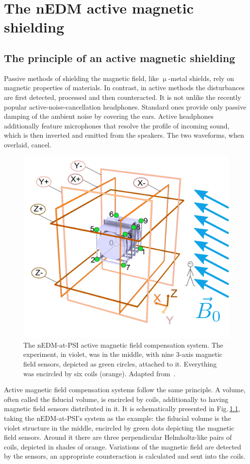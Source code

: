 \chapter{The nEDM active magnetic shielding}

\label{ch:nedm_sfc}


\section{The principle of an active magnetic shielding}
Passive methods of shielding the magnetic field, like $\upmu$-metal shields, rely on magnetic properties of materials. In contrast, in active methods the disturbances are first detected, processed and then counteracted. It is not unlike the recently popular active-noise-cancellation headphones. Standard ones provide only passive damping of the ambient noise by covering the ears. Active headphones additionally feature microphones that resolve the profile of incoming sound, which is then inverted and emitted from the speakers. The two waveforms, when overlaid, cancel.

\begin{figure}
  \centering
  \includegraphics[width=0.7\linewidth]{gfx/nEDM_SFC/SFCplain.pdf}
  \caption{The nEDM-at-PSI active magnetic field compensation system. The experiment, in violet, was in the middle, with nine 3-axis magnetic field sensors, depicted as green circles, attached to it. Everything was encircled by six coils (orange). Adapted from~\cite{Franke2013}.}
  \label{fig:sfc-scheme}
\end{figure}

Active magnetic field compensation systems follow the same principle. A volume, often called the fiducial volume, is encircled by coils, additionally to having magnetic field sensors distributed in it. It is schematically presented in Fig.\,\ref{fig:sfc-scheme}, taking the nEDM-at-PSI's system as the example: the fiducial volume is the violet structure in the middle, encircled by green dots depicting the magnetic field sensors. Around it there are three perpendicular Helmholtz-like pairs of coils, depicted in shades of orange. Variations of the magnetic field are detected by the sensors, an appropriate counteraction is calculated and sent into the coils.


